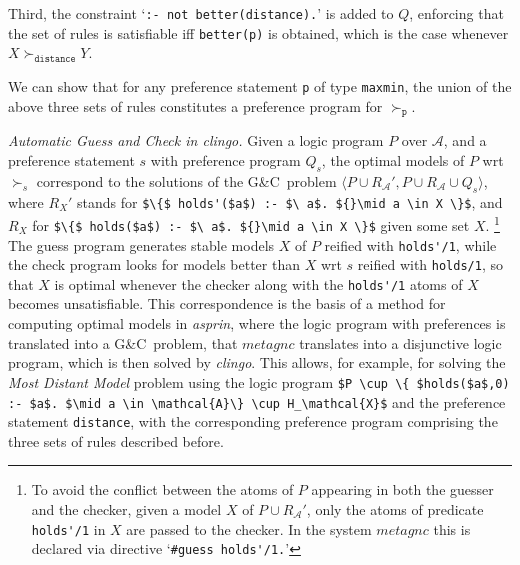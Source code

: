 \documentclass[a4paper,USenglish]{oasics-v2016}
\newcommand{\lm}[1]{\lstinline[mathescape=true]!#1!}
\newcommand{\gc}[0]{G{\&}C}
\newcommand{\sysfont}{\textit}
\newcommand{\asprin}{\sysfont{asprin}}
\newcommand{\clingo}{\sysfont{clingo}}
\begin{document}
Third, %
the constraint
`\lm{:- not better(distance).}'
%
is added to $Q$, %
enforcing that 
the set of rules is satisfiable iff \lm{better(p)} is obtained, 
which is the case whenever $X \succ_\mathtt{distance} Y$. 
%

We can show that for any preference statement \lm{p} of type \lm{maxmin}, 
the union of the above three sets of rules constitutes a preference program for $\succ_\mathtt{p}$.


\emph{Automatic Guess and Check in \clingo.}
%
Given a logic program $P$ over $\mathcal{A}$, and a preference statement $s$ with preference program $Q_s$, 
the optimal models of $P$ wrt $\succ_s$ correspond to the solutions of the \gc\ problem
$\langle P \cup R_\mathcal{A}',P \cup R_\mathcal{A} \cup Q_s\rangle$, 
where $R_X'$ stands for \lm{$\{$ holds'($a$) :- $\ a$. ${}\mid a \in X \}$}, 
and $R_X$ for \lm{$\{$ holds($a$) :- $\ a$. ${}\mid a \in X \}$} given some set $X$.%
\footnote{To avoid the conflict between the atoms of $P$ appearing in both the guesser and the checker, 
given a model $X$ of $P \cup R_{\mathcal{A}}'$, only the atoms of predicate \lm{holds'/1} in $X$ are passed to the checker.
In the system $\mathit{metagnc}$ this is declared via directive `\lstinline!#guess holds'/1.!'}
%
The guess program generates stable models $X$ of $P$ reified with \lstinline!holds'/1!,
while the check program looks for models better than $X$ wrt $s$ reified with \lstinline!holds/1!,
so that $X$ is optimal whenever the checker along with the \lstinline!holds'/1! atoms of $X$ becomes unsatisfiable.
%
This correspondence is the basis of a method for computing optimal models in \asprin, 
where the logic program with preferences is translated into a \gc\ problem, 
that $\mathit{metagnc}$ translates into a disjunctive logic program,
which is then solved by \clingo.
%
This allows, for example, for solving the \emph{Most Distant Model} problem using the logic program 
\lstinline[mathescape=true]!$P \cup \{ $holds($a$,0) :- $a$. $\mid a \in \mathcal{A}\} \cup H_\mathcal{X}$! 
and the preference statement \lstinline!distance!,
with the corresponding preference program comprising the three sets of rules described before.
\end{document}
